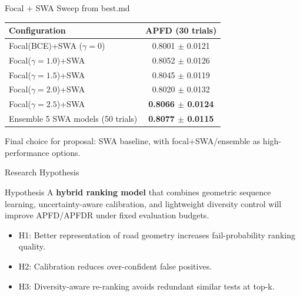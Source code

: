 ﻿\documentclass[10pt,aspectratio=169]{beamer}
\begin{document}
\begin{frame}{Focal + SWA Sweep from best.md}
\scriptsize
\begin{table}
\centering
\begin{tabular}{lc}
\toprule
\textbf{Configuration} & \textbf{APFD (30 trials)} \\
\midrule
Focal(BCE)+SWA ($\gamma=0$) & 0.8001 $\pm$ 0.0121 \\
Focal($\gamma=1.0$)+SWA & 0.8052 $\pm$ 0.0126 \\
Focal($\gamma=1.5$)+SWA & 0.8045 $\pm$ 0.0119 \\
Focal($\gamma=2.0$)+SWA & 0.8020 $\pm$ 0.0132 \\
Focal($\gamma=2.5$)+SWA & \textbf{0.8066 $\pm$ 0.0124} \\
\midrule
Ensemble 5 SWA models (50 trials) & \textbf{0.8077 $\pm$ 0.0115} \\
\bottomrule
\end{tabular}
\end{table}
\vspace{0.1cm}
\small
Final choice for proposal: SWA baseline, with focal+SWA/ensemble as high-performance options.
\end{frame}

\begin{frame}{Research Hypothesis}
\begin{block}{Hypothesis}
A \textbf{hybrid ranking model} that combines geometric sequence learning, uncertainty-aware calibration, and lightweight diversity control will improve APFD/APFDR under fixed evaluation budgets.
\end{block}
\vspace{0.2cm}
\begin{itemize}
  \item H1: Better representation of road geometry increases fail-probability ranking quality.
  \item H2: Calibration reduces over-confident false positives.
  \item H3: Diversity-aware re-ranking avoids redundant similar tests at top-k.
\end{itemize}
\end{frame}
\end{document}
